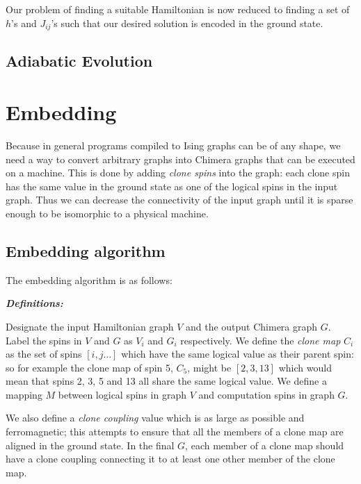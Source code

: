 \documentclass[12pt]{dalthesis}
\begin{document}
Our problem of finding a suitable Hamiltonian is now reduced to finding a set of $h$'s and $J_{ij}$'s such that our desired solution is encoded in the ground state.

\section{Adiabatic Evolution}

\chapter{Embedding}
Because in general programs compiled to Ising graphs can be of any shape, we need a way to convert arbitrary graphs into Chimera graphs that can be executed on a machine.  This is done by adding \emph{clone spins} into the graph: each clone spin has the same value in the ground state as one of the logical spins in the input graph.  Thus we can decrease the connectivity of the input graph until it is sparse enough to be isomorphic to a physical machine.

\section{ Embedding algorithm}

The embedding algorithm is as follows:

\emph{\textbf{Definitions:}}

Designate the input Hamiltonian graph $V$ and the output Chimera graph $G$.  Label the spins in $V$ and $G$ as $V_i$ and $G_i$ respectively.
We define the \emph{clone map} $C_i$ as the set of spins $[i,j \ldots]$ which have the same logical value as their parent spin: so for example the clone map of spin 5, $C_5$, might be $[2,3,13]$ which would mean that spins 2, 3, 5 and 13 all share the same logical value.  We define a mapping $M$ between logical spins in graph $V$ and computation spins in graph $G$.  

We also define a \emph{clone coupling} value which is as large as possible and ferromagnetic; this attempts to ensure that all the members of a clone map are aligned in the ground state.  In the final $G$, each member of a clone map should have a clone coupling connecting it to at least one other member of the clone map.
\end{document}
